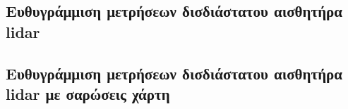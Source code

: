 \subsection{Ευθυγράμμιση μετρήσεων δισδιάστατου αισθητήρα lidar}
\subsection{Ευθυγράμμιση μετρήσεων δισδιάστατου αισθητήρα lidar με σαρώσεις χάρτη}
